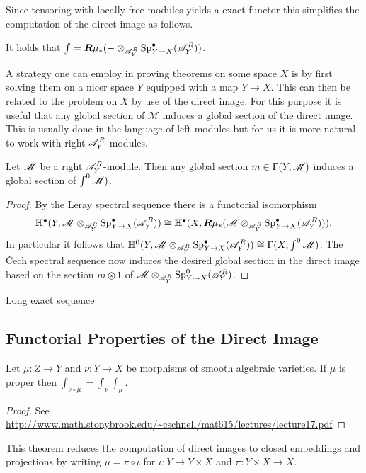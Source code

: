     Since tensoring with locally free modules yields a exact functor this simplifies the computation of the direct image as follows.
    \begin{corollary}
        It holds that $\int = \boldsymbol{R}\mu_* ({-}\otimes_{\mathscr{A}_Y^R} \operatorname{Sp}_{Y\to X}^\bullet(\mathscr{A}_Y^R))$.
    \end{corollary}
    A strategy one can employ in proving theorems on some space $X$ is by first solving them on a nicer space $Y$ equipped with a map $Y\to X$. This can then be related to the problem on $X$ by use of the direct image. For this purpose it is useful that any global section of $\mathcal{M}$ induces a global section of the direct image. This is usually done in the language of left modules but for us it is more natural to work with right $\mathscr{A}_Y^R$-modules.
    \begin{lemma}
        Let $\mathscr{M}$ be a right $\mathscr{A}_Y^R$-module. Then any global section $m\in\Gamma(Y,\mathscr{M})$ induces a global section of $\int^0\mathscr{M})$.
    \end{lemma}
    \begin{proof}
      By the Leray spectral sequence there is a functorial isomorphism
      $$\mathbb{H}^\bullet(Y,\mathscr{M}\otimes_{\mathscr{A}_Y^R} \operatorname{Sp}_{Y\to X}^\bullet(\mathscr{A}_Y^R)) \cong \mathbb{H}^\bullet(X,\boldsymbol{R}\mu_*(\mathscr{M}\otimes_{\mathscr{A}_Y^R} \operatorname{Sp}_{Y\to X}^\bullet(\mathscr{A}_Y^R))).$$
      In particular it follows that $\mathbb{H}^0(Y,\mathscr{M} \otimes_{\mathscr{A}_Y^R} \operatorname{Sp}_{Y\to X}^\bullet(\mathscr{A}_Y^R)) \cong \Gamma(X,\int^0\mathscr{M})$. The \v Cech spectral sequence now induces the desired global section in the direct image based on the section $m\otimes 1$ of $\mathscr{M} \otimes_{\mathscr{A}_Y^R}\operatorname{Sp}_{Y\to X}^0(\mathscr{A}_Y^R)$.
    \end{proof}
    \begin{theorem}
      Long exact sequence
    \end{theorem}
    \subsection{Functorial Properties of the Direct Image}
    \begin{theorem}
       Let $\mu:Z\to Y$ and $\nu:Y\to X$ be morphisms of smooth algebraic varieties. If $\mu$ is proper then $\int_{\nu\circ \mu} = \int_\nu \int_\mu$.
    \end{theorem}
    \begin{proof}
      See \url{http://www.math.stonybrook.edu/~cschnell/mat615/lectures/lecture17.pdf}
    \end{proof}
    This theorem reduces the computation of direct images to closed embeddings and projections by writing $\mu = \pi \circ \iota$ for $\iota:Y\to Y\times X$ and $\pi:Y\times X\to X$.




